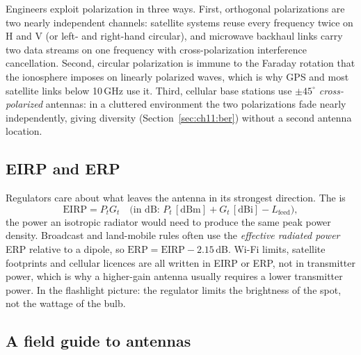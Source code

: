 
Engineers exploit polarization in three ways. First, orthogonal polarizations are two nearly
independent channels: satellite systems reuse every frequency twice on H and V (or left- and
right-hand circular), and microwave backhaul links carry two data streams on one frequency
with cross-polarization interference cancellation. Second, circular polarization is immune to
the Faraday rotation that the ionosphere imposes on linearly polarized waves, which is why GPS
and most satellite links below 10\,GHz use it. Third, cellular base stations use
\emph{$\pm45^\circ$ cross-polarized} antennas: in a cluttered environment the two polarizations
fade nearly independently, giving diversity (Section~\ref{sec:ch11:ber}) without a second
antenna location.

\subsection{EIRP and ERP}

Regulators care about what leaves the antenna in its strongest direction. The
 is
\begin{equation}
\mathrm{EIRP}=P_tG_t\quad\text{(in dB: }P_t\,[\mathrm{dBm}]+G_t\,[\mathrm{dBi}]-L_{\text{feed}}\text{)},
\end{equation}
the power an isotropic radiator would need to produce the same peak power density. Broadcast
and land-mobile rules often use the \emph{effective radiated power} ERP relative to a dipole,
so $\mathrm{ERP}=\mathrm{EIRP}-2.15$\,dB. Wi-Fi limits, satellite footprints and cellular licences
are all written in EIRP or ERP, not in transmitter power, which is why a higher-gain antenna
usually requires a lower transmitter power. In the flashlight picture: the regulator limits the
brightness of the spot, not the wattage of the bulb.

\subsection{A field guide to antennas}

